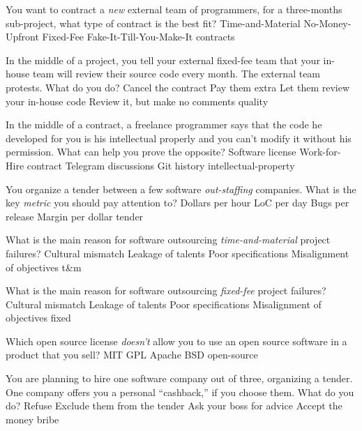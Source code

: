 \documentclass{article}
\begin{document}

\pmbaQuestion
  {You want to contract a \emph{new} external team of programmers, for a three-months sub-project, what type of contract is the best fit?}
  {Time-and-Material}
  {No-Money-Upfront}
  {Fixed-Fee}
  {Fake-It-Till-You-Make-It}
  {contracts}

\pmbaQuestion
  {In the middle of a project, you tell your external fixed-fee team that your in-house team will review their source code every month. The external team protests. What do you do?}
  {Cancel the contract}
  {Pay them extra}
  {Let them review your in-house code}
  {Review it, but make no comments}
  {quality}

\pmbaQuestion
  {In the middle of a contract, a freelance programmer says that the code he developed for you is his intellectual properly and you can't modify it without his permission. What can help you prove the opposite?}
  {Software license}
  {Work-for-Hire contract}
  {Telegram discussions}
  {Git history}
  {intellectual-property}

\pmbaQuestion
  {You organize a tender between a few software \emph{out-staffing} companies. What is the key \emph{metric} you should pay attention to?}
  {Dollars per hour}
  {LoC per day}
  {Bugs per release}
  {Margin per dollar}
  {tender}

\pmbaQuestion
  {What is the main reason for software outsourcing \emph{time-and-material} project failures?}
  {Cultural mismatch}
  {Leakage of talents}
  {Poor specifications}
  {Misalignment of objectives}
  {t\&m}

\pmbaQuestion
  {What is the main reason for software outsourcing \emph{fixed-fee} project failures?}
  {Cultural mismatch}
  {Leakage of talents}
  {Poor specifications}
  {Misalignment of objectives}
  {fixed}

\pmbaQuestion
  {Which open source license \emph{doesn't} allow you to use an open source software in a product that you sell?}
  {MIT}
  {GPL}
  {Apache}
  {BSD}
  {open-source}

\pmbaQuestion
  {You are planning to hire one software company out of three, organizing a tender. One company offers you a personal ``cashback,'' if you choose them. What do you do?}
  {Refuse}
  {Exclude them from the tender}
  {Ask your boss for advice}
  {Accept the money}
  {bribe}

\end{document}
